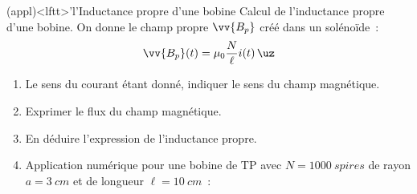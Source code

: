 \documentclass[../../main/main.tex]{subfiles}
\begin{document}
\begin{tcb*}[breakable](appl)<lftt>'l'{Inductance propre d'une bobine}
	Calcul de l'inductance propre d'une bobine. On donne le champ propre
	$\vv{B_p}$ créé dans un solénoïde~:
	\[
		\vv{B_p}(t) = \mu_0 \frac{N}{\ell }i(t)\,\uz
	\]
	\begin{enumerate}
		\item Le sens du courant étant donné, indiquer le sens du champ magnétique.
		      \smallbreak
		      \noindent
		      \begin{minipage}[c]{.4\linewidth}
			      \begin{center}
			      \end{center}
		      \end{minipage}
		      \hfill
		      \begin{minipage}[c]{.69\linewidth}
		      \end{minipage}
		\item Exprimer le flux du champ magnétique.
		      \smallbreak
		\item En déduire l'expression de l'inductance propre.

		\item Application numérique pour une bobine de TP avec $N =
			      \SI{1000}{spires}$ de rayon $a = \SI{3}{cm}$ et de longueur $\ell =
			      \SI{10}{cm}$~:
		      \psw{%
			      \[
				      L \approx \SI{35}{mH}
			      \]
			      \vspace*{-10pt}
		      }%
	\end{enumerate}
\end{tcb*}
\end{document}

